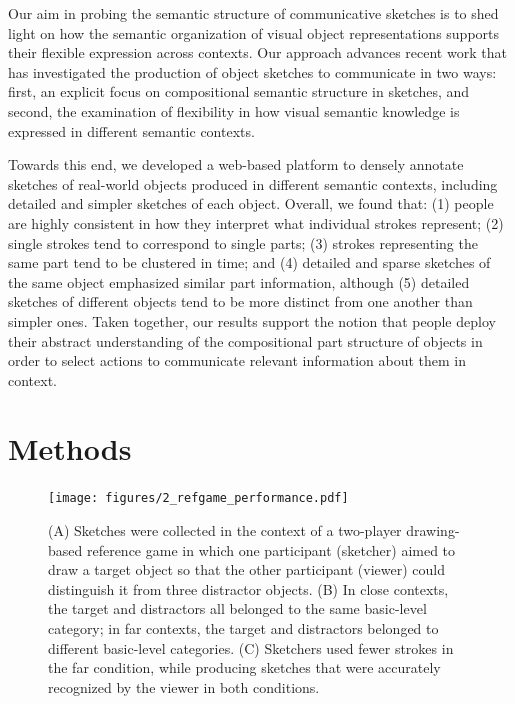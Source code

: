 \documentclass[10pt,letterpaper]{article}
\begin{document}
Our aim in probing the semantic structure of communicative sketches is to shed light on how the semantic organization of visual object representations supports their flexible expression across contexts. 
Our approach advances recent work \cite{FanCommon2018} that has investigated the production of object sketches to communicate in two ways: first, an explicit focus on compositional semantic structure in sketches, and second, the examination of flexibility in how visual semantic knowledge is expressed in different semantic contexts. 

Towards this end, we developed a web-based platform to densely annotate sketches of real-world objects produced in different semantic contexts, including detailed and simpler sketches of each object. 
Overall, we found that: (1) people are highly consistent in how they interpret what individual strokes represent; (2) single strokes tend to correspond to single parts; (3) strokes representing the same part tend to be clustered in time; and (4) detailed and sparse sketches of the same object emphasized similar part information, although (5) detailed sketches of different objects tend to be more distinct from one another than simpler ones. 
Taken together, our results support the notion that people deploy their abstract understanding of the compositional part structure of objects in order to select actions to communicate relevant information about them in context. 

\section{Methods}

\begin{figure}[htbp]
\centering
\texttt{[image: figures/2\_refgame\_performance.pdf]}
\caption{(A) Sketches were collected in the context of a two-player drawing-based reference game in which one participant (sketcher) aimed to draw a target object so that the other participant (viewer) could distinguish it from three distractor objects. (B) In close contexts, the target and distractors all belonged to the same basic-level category; in far contexts, the target and distractors belonged to different basic-level categories. (C) Sketchers used fewer strokes in the far condition, while producing sketches that were accurately recognized by the viewer in both conditions.}
\label{refgame_performance}
\end{figure}
\end{document}
